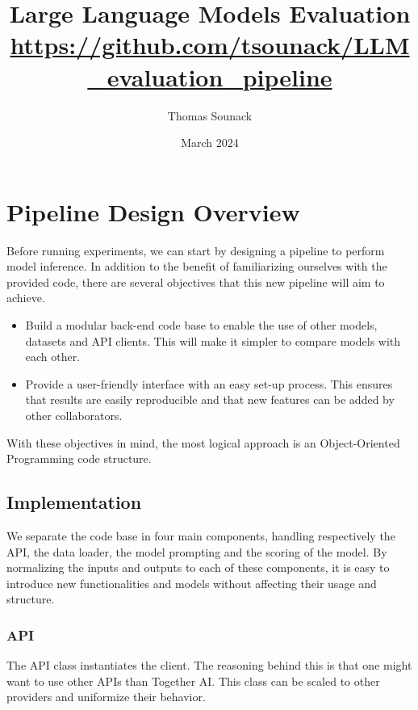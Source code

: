 \documentclass[11pt]{article}
\title{
    Large Language Models Evaluation\\
    \vspace{1em}
    \small{\normalfont \href{https://github.com/tsounack/LLM_evaluation_pipeline}{https://github.com/tsounack/LLM\_evaluation\_pipeline}
    }
}
\author{Thomas Sounack}
\date{March 2024}
\begin{document}
\maketitle

\tableofcontents

\newpage

\section{Pipeline Design Overview}

Before running experiments, we can start by designing a pipeline to perform model inference. In addition to the benefit of familiarizing ourselves with the provided code, there are several objectives that this new pipeline will aim to achieve.

\begin{itemize}
    \item Build a modular back-end code base to enable the use of other models, datasets and API clients. This will make it simpler to compare models with each other.\\
    \item Provide a user-friendly interface with an easy set-up process. This ensures that results are easily reproducible and that new features can be added by other collaborators.
\end{itemize}

With these objectives in mind, the most logical approach is an Object-Oriented Programming code structure.

\subsection{Implementation}

We separate the code base in four main components, handling respectively the API, the data loader, the model prompting and the scoring of the model. By normalizing the inputs and outputs to each of these components, it is easy to introduce new functionalities and models without affecting their usage and structure.

\subsubsection{API}
The API class instantiates the client. The reasoning behind this is that one might want to use other APIs than Together AI. This class can be scaled to other providers and uniformize their behavior.
\end{document}
